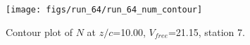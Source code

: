 \begin{figure}[H]
\centering
\texttt{[image: figs/run\_64/run\_64\_num\_contour]}
\caption{Contour plot of $N$ at $z/c$=10.00, $V_{free}$=21.15, station 7.}
\end{figure}


